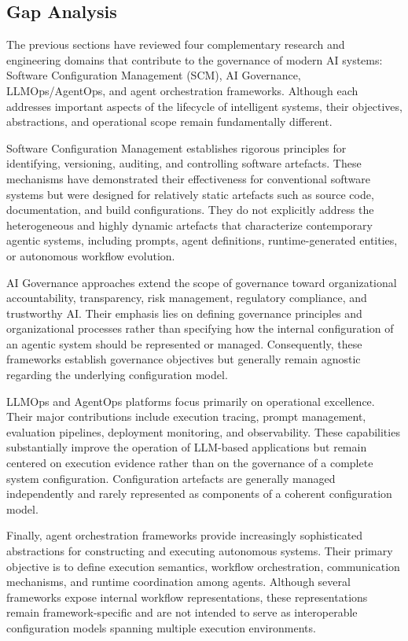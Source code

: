 \documentclass[10pt]{article}
\begin{document}
\subsection{Gap Analysis}
\label{sec:gap_analysis}

The previous sections have reviewed four complementary research and engineering domains that contribute to the governance of modern AI systems: Software Configuration Management (SCM), AI Governance, LLMOps/AgentOps, and agent orchestration frameworks. Although each addresses important aspects of the lifecycle of intelligent systems, their objectives, abstractions, and operational scope remain fundamentally different.

Software Configuration Management establishes rigorous principles for identifying, versioning, auditing, and controlling software artefacts. These mechanisms have demonstrated their effectiveness for conventional software systems but were designed for relatively static artefacts such as source code, documentation, and build configurations. They do not explicitly address the heterogeneous and highly dynamic artefacts that characterize contemporary agentic systems, including prompts, agent definitions, runtime-generated entities, or autonomous workflow evolution.

AI Governance approaches extend the scope of governance toward organizational accountability, transparency, risk management, regulatory compliance, and trustworthy AI. Their emphasis lies on defining governance principles and organizational processes rather than specifying how the internal configuration of an agentic system should be represented or managed. Consequently, these frameworks establish governance objectives but generally remain agnostic regarding the underlying configuration model.

LLMOps and AgentOps platforms focus primarily on operational excellence. Their major contributions include execution tracing, prompt management, evaluation pipelines, deployment monitoring, and observability. These capabilities substantially improve the operation of LLM-based applications but remain centered on execution evidence rather than on the governance of a complete system configuration. Configuration artefacts are generally managed independently and rarely represented as components of a coherent configuration model.

Finally, agent orchestration frameworks provide increasingly sophisticated abstractions for constructing and executing autonomous systems. Their primary objective is to define execution semantics, workflow orchestration, communication mechanisms, and runtime coordination among agents. Although several frameworks expose internal workflow representations, these representations remain framework-specific and are not intended to serve as interoperable configuration models spanning multiple execution environments.
\end{document}
